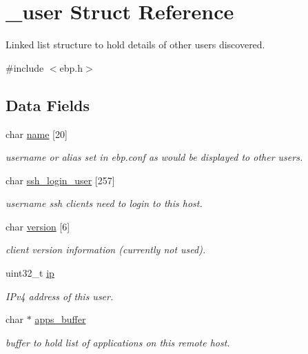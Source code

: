 \hypertarget{struct__user}{\section{\-\_\-user \-Struct \-Reference}
\label{struct__user}
}


\-Linked list structure to hold details of other users discovered.  




{\ttfamily \#include $<$ebp.\-h$>$}

\subsection*{\-Data \-Fields}
\begin{DoxyCompactItemize}
\item 
char \hyperlink{struct__user_a9997d8ee2df51d18efed254a5aa016fd}{name} \mbox{[}20\mbox{]}
\begin{DoxyCompactList}\small\item\em username or alias set in ebp.\-conf as would be displayed to other users. \end{DoxyCompactList}\item 
char \hyperlink{struct__user_af76bd0a7de47a2e1828baff39eaaed91}{ssh\-\_\-login\-\_\-user} \mbox{[}257\mbox{]}
\begin{DoxyCompactList}\small\item\em username ssh clients need to login to this host. \end{DoxyCompactList}\item 
char \hyperlink{struct__user_a165e21f39fbada4a3730f571966fb4bb}{version} \mbox{[}6\mbox{]}
\begin{DoxyCompactList}\small\item\em client version information (currently not used). \end{DoxyCompactList}\item 
uint32\-\_\-t \hyperlink{struct__user_a69ddb9c845da426f636d9dd0dbed4e7e}{ip}
\begin{DoxyCompactList}\small\item\em \-I\-Pv4 address of this user. \end{DoxyCompactList}\item 
char $\ast$ \hyperlink{struct__user_af76725a970e53676ee8ec7c0f83804d0}{apps\-\_\-buffer}
\begin{DoxyCompactList}\small\item\em buffer to hold list of applications on this remote host. \end{DoxyCompactList}\item 

\end{DoxyCompactItemize}
